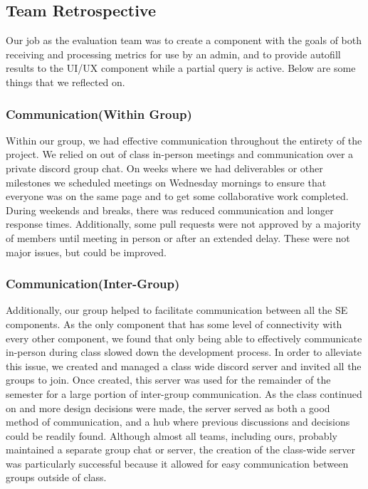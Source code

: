 \subsection*{Team Retrospective}
Our job as the evaluation team was to create a component with the goals of both receiving and processing metrics for use by an admin, and to provide autofill results to the UI/UX component while a partial query is active. Below are some things that we reflected on.

\smallskip\subsubsection*{Communication(Within Group)}
Within our group, we had effective communication throughout the entirety of the project. We relied on out of class in-person meetings and communication over a private discord group chat. On weeks where we had deliverables or other milestones we scheduled meetings on Wednesday mornings to ensure that everyone was on the same page and to get some collaborative work completed. 
\smallbreak
During weekends and breaks, there was reduced communication and longer response times. Additionally, some pull requests were not approved by a majority of members until meeting in person or after an extended delay. These were not major issues, but could be improved.

\smallskip\subsubsection*{Communication(Inter-Group)}
Additionally, our group helped to facilitate communication between all the SE components. As the only component that has some level of connectivity with every other component, we found that only being able to effectively communicate in-person during class slowed down the development process. In order to alleviate this issue, we created and managed a class wide discord server and invited all the groups to join. 
\smallbreak
Once created, this server was used for the remainder of the semester for a large portion of inter-group communication. As the class continued on and more design decisions were made, the server served as both a good method of communication, and a hub where previous discussions and decisions could be readily found. 
\smallbreak
Although almost all teams, including ours, probably maintained a separate group chat or server, the creation of the class-wide server was particularly successful because it allowed for easy communication between groups outside of class.

